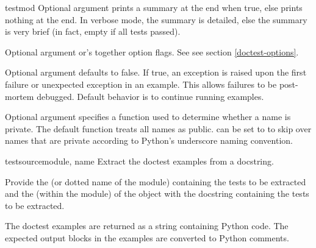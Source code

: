 \begin{funcdesc}{testmod}
  Optional argument  prints a summary at the end when true,
  else prints nothing at the end.  In verbose mode, the summary is
  detailed, else the summary is very brief (in fact, empty if all tests
  passed).

  Optional argument  or's together option flags.  See
  see section \ref{doctest-options}.

  Optional argument  defaults to false.  If true,
  an exception is raised upon the first failure or unexpected exception
  in an example.  This allows failures to be post-mortem debugged.
  Default behavior is to continue running examples.

  Optional argument  specifies a function used to
  determine whether a name is private.  The default function treats
  all names as public.   can be set to
   to skip over names that are
  private according to Python's underscore naming convention.


\end{funcdesc}

\begin{funcdesc}{testsource}{module, name}
  Extract the doctest examples from a docstring.

  Provide the  (or dotted name of the module) containing the
  tests to be extracted and the  (within the module) of the object
  with the docstring containing the tests to be extracted.

  The doctest examples are returned as a string containing Python
  code.  The expected output blocks in the examples are converted
  to Python comments.
\end{funcdesc}

